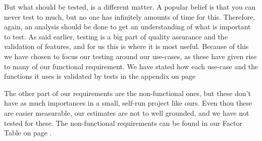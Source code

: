 But what should be tested, is a different matter. A popular belief is that you can never test to much, but no one has infinitely amounts of time for this. Therefore, again, an analysis should be done to get an understanding of what is important to test. As said earlier, testing is a big part of quality assurance and the validation of features, and for us this is where it is most useful. Because of this we have chosen to focus our testing around our use-cases, as these have given rise to many of our functional requirement. We have stated how each use-case and the functions it uses is validated by tests in the appendix on page \pageref{TestAppendix}

The other part of our requirements are the non-functional ones, but these don't have as much importances in a small, self-run project like ours. Even thou these are easier measurable, our estimates are not to well grounded, and we have not tested for these. The non-functional requirements can be found in our Factor Table on page \pageref{FactorTable}.

